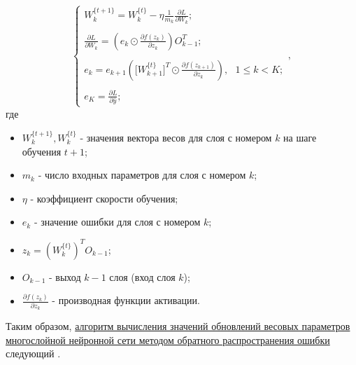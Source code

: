 \documentclass[12pt]{article}
\begin{document}
\begin{sloppypar}
\begin{equation}
\label{ch1:eqn:backpropagation}
\begin{cases}
     W_{k}^{\{t+1\}} = W_{k}^{\{t\}}-\eta \frac{1}{m_k}\frac{\partial L }{\partial W_{k}};
     \\\\
    \frac{\partial L }{\partial W_{k}}= \left(e_{k} \odot \frac{\partial f(z_{k})}{\partial z_{k} } \right)  O_{k-1}^T; 
    \\\\
    e_{k} = e_{k+1}\left(\big[W_{k+1}^{\{t\}}\big]^T\odot \frac{\partial f(z_{k+1})}{\partial z_{k} }\right), \text{ $1\le k < K$};
    \\\\
    e_{K} = \frac{\partial L }{\partial \hat y};
 \end{cases},
\end{equation}
где
\begin{itemize}
\item $W_{k}^{\{t+1\}} , W_{k}^{\{t\}}$ - значения вектора весов для слоя с номером $k$ на шаге обучения $t+1$; 
\item $m_k$ - число входных параметров для слоя с номером $k$;
\item $\eta$ - коэффициент скорости обучения; 
\item $e_{k}$ - значение ошибки для слоя с номером $k$; 
\item $z_k =  (W_{k}^{\{t\}})^T O_{k-1}$; 
\item $O_{k-1}$ - выход  $k-1$ слоя (вход слоя $k$);
\item $\frac{\partial f(z_{k})}{\partial z_{k}}$ - производная функции активации.
\end{itemize}

Таким образом, 
\uline{алгоритм  вычисления значений обновлений весовых параметров многослойной нейронной сети методом обратного распространения ошибки} 
следующий \cite{Nikolenko2017DL}. 


\end{sloppypar}
\end{document}
